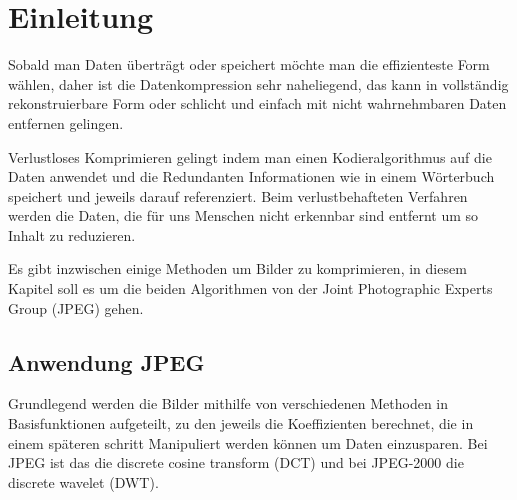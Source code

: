 %
%
%
%
\section{Einleitung\label{jpeg:section:einleitung}}
Sobald man Daten überträgt oder speichert möchte man die effizienteste Form wählen, daher ist die Datenkompression sehr naheliegend, das kann in vollständig rekonstruierbare Form oder
schlicht und einfach mit nicht wahrnehmbaren Daten entfernen gelingen.

Verlustloses Komprimieren gelingt indem man einen Kodieralgorithmus auf die Daten anwendet und die Redundanten Informationen wie in einem Wörterbuch speichert und jeweils darauf referenziert. Beim verlustbehafteten Verfahren werden die Daten, die für uns Menschen nicht erkennbar sind entfernt um so Inhalt zu reduzieren.

Es gibt inzwischen einige Methoden um Bilder zu komprimieren, in diesem Kapitel soll es um die beiden Algorithmen von der Joint Photographic Experts Group (JPEG) gehen.

\subsection{Anwendung JPEG\label{jpeg:subsection:anwendung}}
Grundlegend werden die Bilder mithilfe von verschiedenen Methoden in Basisfunktionen aufgeteilt, zu den jeweils die Koeffizienten berechnet, die in einem späteren schritt Manipuliert werden können um Daten einzusparen. Bei JPEG ist das die \glqq discrete cosine transform \grqq  (DCT) und bei JPEG-2000 die \glqq discrete wavelet \grqq  (DWT).